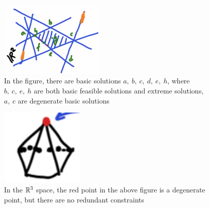 \documentclass[11pt]{article}
\numberwithin{equation}{section}
\begin{document}
\begin{figure}[H]
    \centering
    \includegraphics[width=5cm]{images/6-ex-3.png}
    \caption{In the figure, there are basic solutions $a, \ b, \ c,\ d,\ e, \ h$, where $b, \ c,\ e, \ h$ are both basic feasible solutions and extreme solutions, $a, \ c$ are degenerate basic solutions}
\end{figure}

\begin{figure}[H]
    \centering
    \includegraphics[width = 4cm]{images/6-ex-5.png}
    \caption{In the $\mathbb R^3$ space, the red point in the above figure is a degenerate point, but there are no redundant constraints}
\end{figure}
\end{document}
